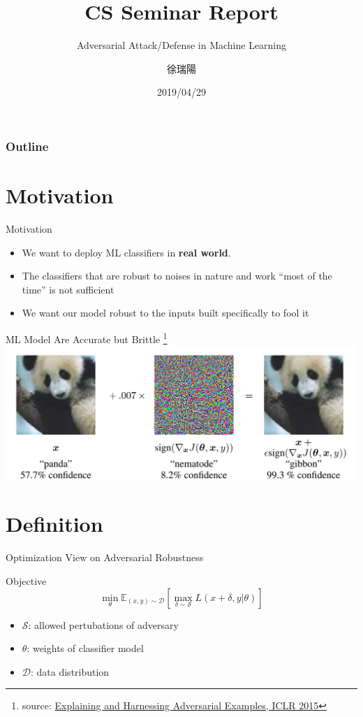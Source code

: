\documentclass{beamer}
\title{CS Seminar Report}
\subtitle{\textcolor[rgb]{0.00,0.50,1.00}{{Adversarial Attack/Defense in Machine Learning}}}
\author{徐瑞陽}
\date{2019/04/29}
\begin{document}
\begin{frame}
\maketitle
\end{frame}

\begin{frame}
\frametitle{Outline}
\tableofcontents
\end{frame}

\section{Motivation}
\begin{frame}{Motivation}
  \begin{itemize}
    \item We want to deploy ML classifiers in \textbf{real world}.
    \item The classifiers that are robust to noises in nature and work ``most of the time'' is not sufficient
    \item We want our model robust to the inputs built specifically to fool it
  \end{itemize}
\end{frame}

\begin{frame}{ML Model Are Accurate but Brittle}
  \footnote{source: \href{http://metalearning-symposium.ml/files/vinyals.pdf}{Explaining and Harnessing Adversarial Examples, ICLR 2015}}
  \includegraphics[width=\textwidth]{fig/idea.png}
\end{frame}

\section{Definition}
\begin{frame}{Optimization View on Adversarial Robustness}
  \begin{block}{Objective}
    \[ \min_\theta \mathbb{E}_{(x,y) \sim \mathcal{D}}[\max_{\delta \sim \mathcal{S}}L(x+\delta,y|\theta)]\]
  \end{block}
  \begin{itemize}
    \item $\mathcal{S}$: allowed pertubations of adversary
    \item $\theta$: weights of classifier model
    \item $\mathcal{D}$: data distribution
  \end{itemize}
\end{frame}
\end{document}
